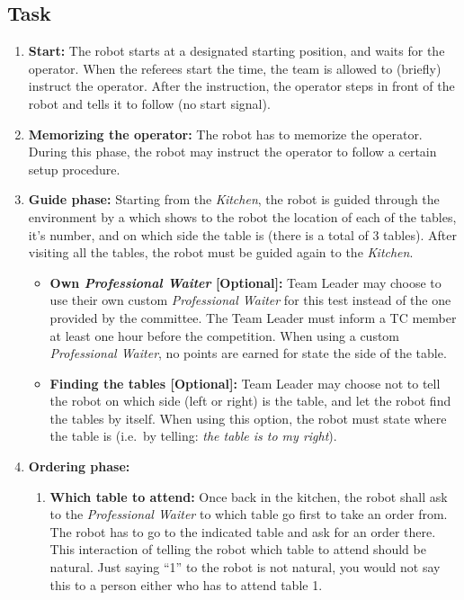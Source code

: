 \subsection{Task}
\begin{enumerate}
	\item \textbf{Start:} The robot starts at a designated starting position, and waits for the  operator. When the referees start the time, the team is allowed to (briefly) instruct the operator. After the instruction, the operator steps in front of the robot and tells it to follow (no start signal).

	\item \textbf{Memorizing the operator:} The robot has to memorize the operator. During this phase, the robot may instruct the operator to follow a certain setup procedure.

	\item \textbf{Guide phase:} Starting from the \textit{Kitchen}, the robot is guided through the environment by a  which shows to the robot the location of each of the tables, it's number, and on which side the table is (there is a total of 3 tables). After visiting all the tables, the robot must be guided again to the \textit{Kitchen}.
	\begin{itemize}
		\item \textbf{Own \textit{Professional Waiter} [Optional]:} Team Leader may choose to use their own custom \textit{Professional Waiter} for this test instead of the one provided by the committee. The Team Leader must inform a TC member at least one hour before the competition. When using a custom \textit{Professional Waiter}, no points are earned for state the side of the table.
		\item \textbf{Finding the tables [Optional]:} Team Leader may choose not to tell the robot on which side (left or right) is the table, and let the robot find the tables by itself. When using this option, the robot must state where the table is (i.e.~by telling: \textit{the table is to my right}).
	\end{itemize}

	\item \textbf{Ordering phase:}
	\begin{enumerate}
		\item \textbf{Which table to attend:} Once back in the kitchen, the robot shall ask to the \textit{Professional Waiter} to which table go first to take an order from. 
		  The robot has to go to the indicated table and ask for an order there.
		  This interaction of telling the robot which table to attend should be natural. 
		  Just saying ``1'' to the robot is not natural, you would not say this to a person either who has to attend table 1.
		  

\end{enumerate}
\end{enumerate}
